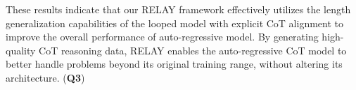 These results indicate that our RELAY framework effectively utilizes the length generalization capabilities of the looped model with explicit CoT alignment to improve the overall performance of auto-regressive model. By generating high-quality CoT reasoning data, RELAY enables the auto-regressive CoT model to better handle problems beyond its original training range, without altering its architecture. (\textbf{Q3})





